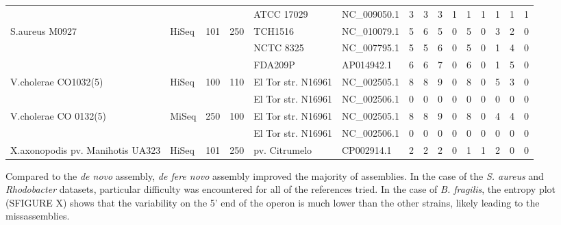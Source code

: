 \documentclass[11pt]{article}
\begin{document}
\begin{linenumbers}
\begin{table}[]
\begin{tabular}{lllllllllllllll}
                                       &                        &                      &                      & ATCC 17029         & NC\_009050.1 & 3   & 3   & 3  & 1       & 1       & 1           & 1       & 1       & 1            \\
\multirow{3}{*}{S.aureus M0927}        & \multirow{3}{*}{HiSeq} & \multirow{3}{*}{101} & \multirow{3}{*}{250} & TCH1516            & NC\_010079.1 & 5   & 6   & 5  & 0       & 5       & 0           & 3       & 2       & 0            \\
                                       &                        &                      &                      & NCTC 8325          & NC\_007795.1 & 5   & 5   & 6  & 0       & 5       & 0           & 1       & 4       & 0            \\
                                       &                        &                      &                      & FDA209P            & AP014942.1   & 6   & 6   & 7  & 0       & 6       & 0           & 1       & 5       & 0            \\
\multirow{2}{*}{V.cholerae CO1032(5)}  & \multirow{2}{*}{HiSeq} & \multirow{2}{*}{100} & \multirow{2}{*}{110} & El Tor str. N16961 & NC\_002505.1 & 8   & 8   & 9  & 0       & 8       & 0           & 5       & 3       & 0            \\
                                       &                        &                      &                      & El Tor str. N16961 & NC\_002506.1 & 0   & 0   & 0  & 0       & 0       & 0           & 0       & 0       & 0            \\
\multirow{2}{*}{V.cholerae CO 0132(5)} & MiSeq                  & 250                  & 100                  & El Tor str. N16961 & NC\_002505.1 & 8   & 8   & 9  & 0       & 8       & 0           & 4       & 4       & 0            \\
                                       &                        &                      &                      & El Tor str. N16961 & NC\_002506.1 & 0   & 0   & 0  & 0       & 0       & 0           & 0       & 0       & 0            \\
X.axonopodis pv. Manihotis UA323       & HiSeq                  & 101                  & 250                  & pv. Citrumelo      & CP002914.1   & 2   & 2   & 2  & 0       & 1       & 1           & 2       & 0       & 0
\end{tabular}
\end{table}

Compared to the \textit{de novo} assembly, \textit{de fere novo} assembly improved the majority of assemblies. In the case of the \textit{S. aureus} and \textit{Rhodobacter} datasets, particular difficulty was encountered for all of the references tried. In the case of \textit{B. fragilis}, the entropy plot (SFIGURE X) shows that the variability on the 5’ end of the operon is much lower than the other strains, likely leading to the missassemblies.



\end{linenumbers}
\end{document}
